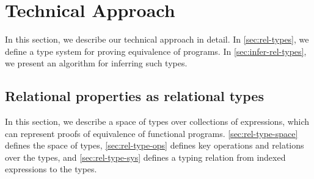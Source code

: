 \section{Technical Approach}
%
In this section, we describe our technical approach in detail.
%
In \autoref{sec:rel-types}, we define a type system for proving
equivalence of programs.
%
In \autoref{sec:infer-rel-types}, we present an algorithm for
inferring such types.

\subsection{Relational properties as relational types}
\label{sec:rel-types}
%
In this section, we describe a space of types over collections of
expressions, which can represent proofs of equivalence of functional
programs.
%
\autoref{sec:rel-type-space} defines the space of types, %
\autoref{sec:rel-type-ops} defines key operations and relations over
the types, and %
\autoref{sec:rel-type-sys} defines a typing relation from indexed
expressions to the types.

